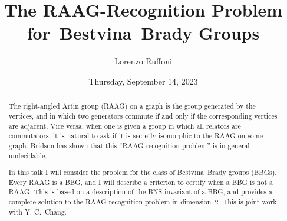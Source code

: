 \documentclass{UAmathtalk}
\author{Lorenzo Ruffoni}
\title{The RAAG-Recognition Problem for~Bestvina--Brady Groups}
\date{Thursday, September 14, 2023}
\begin{document}
\maketitle

\begin{abstract}
The right-angled Artin group (RAAG) on a graph is the group generated by the vertices, and in which two generators commute if and only if the corresponding vertices are adjacent. Vice versa, when one is given a group in which all relators are commutators, it is natural to ask if it is secretly isomorphic to the RAAG on some graph. Bridson has shown that this “RAAG-recognition problem” is in general undecidable.

In this talk I will consider the problem for the class of Bestvina--Brady groups (BBGs). Every RAAG is a BBG, and I will describe a criterion to certify when a BBG is not a RAAG. This is based on a description of the BNS-invariant of a BBG, and provides a complete solution to the RAAG-recognition problem in dimension~$2$. This is joint work with Y.-C.~Chang.

\end{abstract}
\end{document}
